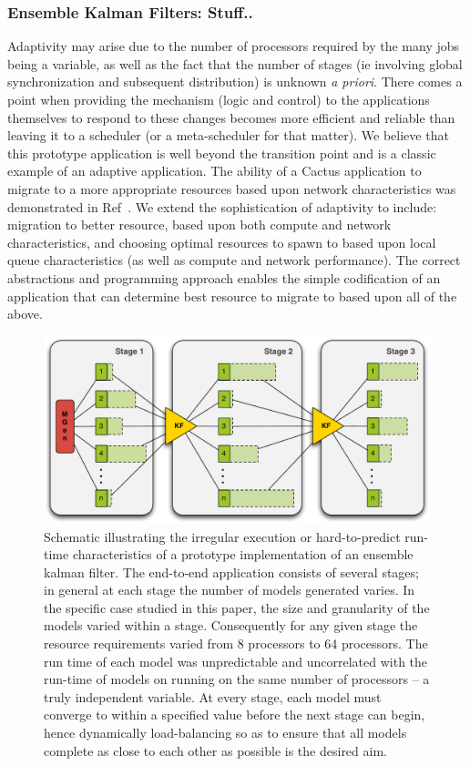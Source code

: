 \documentclass[conference,final]{IEEEtran}
\begin{document}
\subsubsection{Ensemble Kalman Filters: Stuff..} Adaptivity may arise
due to the number of processors required by the many jobs being a
variable, as well as the fact that the number of stages (ie involving
global synchronization and subsequent distribution) is unknown {\it a
  priori}. There comes a point when providing the mechanism (logic and
control) to the applications themselves to respond to these changes
becomes more efficient and reliable than leaving it to a scheduler (or
a meta-scheduler for that matter). We believe that this prototype
application is well beyond the transition point and is a classic
example of an adaptive application.  The ability of a Cactus
application to migrate to a more appropriate resources based upon
network characteristics was demonstrated in Ref~\cite{escience07}.  We
extend the sophistication of adaptivity to include: migration to
better resource, based upon both compute and network characteristics,
and choosing optimal resources to spawn to based upon local queue
characteristics (as well as compute and network performance). The
correct abstractions and programming approach enables the simple
codification of an application that can determine best resource to
migrate to based upon all of the above.

\begin{figure}
\begin{center}
\includegraphics*[scale=0.36,]{./figures/3StageKalmanFilter}
\end{center}
\caption{Schematic illustrating the irregular execution or
  hard-to-predict run-time characteristics of a prototype
  implementation of an ensemble kalman filter. The end-to-end
  application consists of several stages; in general at each stage the
  number of models generated varies. In the specific case studied in
  this paper, the size and granularity of the models varied within a
  stage. Consequently for any given stage the resource requirements
  varied from 8 processors to 64 processors.  The run time of each
  model was unpredictable and uncorrelated with the run-time of models
  on running on the same number of processors -- a truly independent
  variable. At every stage, each model must converge to within a
  specified value before the next stage can begin, hence dynamically
  load-balancing so as to ensure that all models complete as close to
  each other as possible is the desired aim.}
\label{fig:irregular_execution}
\end{figure}
\end{document}

